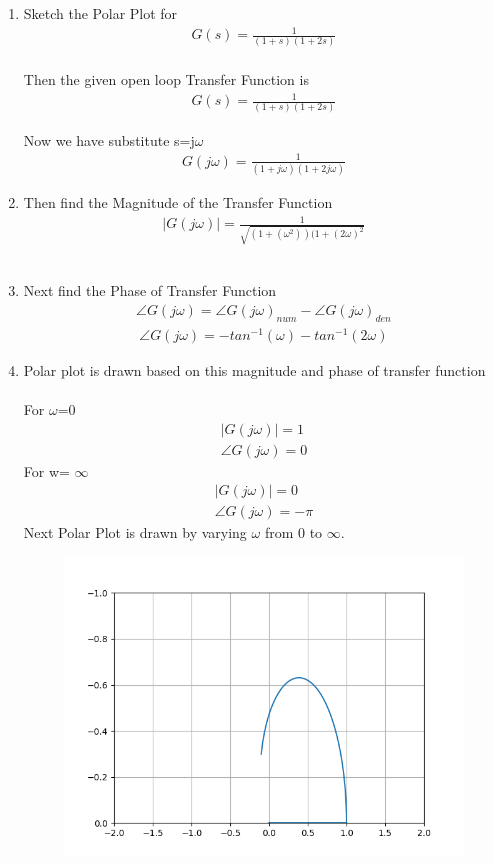 \begin{enumerate}[label=\thesection.\arabic*.,ref=\thesection.\theenumi]
\item
Sketch the Polar Plot for
\begin{align}
G(s) = \frac{1}{(1+s)(1+2s)}
\end{align}
\\
\solution  Then the given open loop Transfer Function is
\begin{align}
G(s) = \frac{1}{(1+s)(1+2s)}
\end{align}

Now we have substitute s=j$\omega$\\
\begin{align}
G(j\omega) = \frac{1}{(1+j\omega)(1+2j\omega)} 
\end{align}
\item
Then find the Magnitude of the Transfer Function
\\
\solution
\begin{multline}
      |G(j\omega)| = \frac{1}{\sqrt{(1+(\omega^2))(1+(2\omega)^2}}
\end{multline}\\
\item
Next find the Phase of Transfer Function\\
\solution
\begin{align}
    \angle G(j\omega) = \angle G(j\omega)_{num} - \angle G(j\omega)_{den}
\end{align}
\begin{multline}
    \angle G(j\omega) = -tan^{-1}(\omega)-tan^{-1}(2\omega)
\end{multline}
\item
Polar plot is drawn based on this magnitude and phase of transfer function\\
\solution\\
For $\omega$=0 
\begin{align}
    |G(j\omega)| = 1\\
    \angle G(j\omega) = 0
\end{align}
For w= $\infty$
\begin{align}
    |G(j\omega)| = 0\\
    \angle G(j\omega) = -\pi
\end{align}
Next Polar Plot is drawn by varying $\omega$ from 0 to $\infty$.\\
\begin{figure}
    \centering
    \includegraphics[width=0.7\linewidth]{Polarplot_A1(a).png}

\end{figure}
\end{enumerate}
